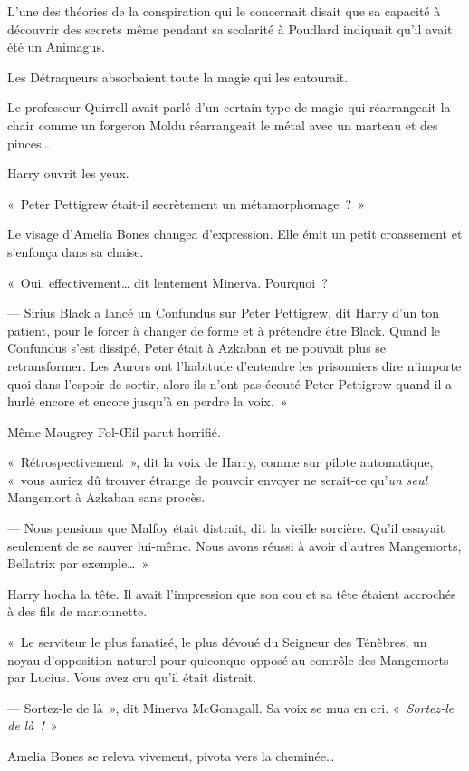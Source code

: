 L'une des théories de la conspiration qui le concernait disait que sa capacité à découvrir des secrets même pendant sa scolarité à Poudlard indiquait qu'il avait été un Animagus.

Les Détraqueurs absorbaient toute la magie qui les entourait.

Le professeur Quirrell avait parlé d'un certain type de magie qui réarrangeait la chair comme un forgeron Moldu réarrangeait le métal avec un marteau et des pinces…

Harry ouvrit les yeux.

«~Peter Pettigrew était-il secrètement un métamorphomage~?~»

Le visage d'Amelia Bones changea d'expression. Elle émit un petit croassement et s'enfonça dans sa chaise.

«~Oui, effectivement… dit lentement Minerva. Pourquoi~?

--- Sirius Black a lancé un Confundus sur Peter Pettigrew, dit Harry d'un ton patient, pour le forcer à changer de forme et à prétendre être Black. Quand le Confundus s'est dissipé, Peter était à Azkaban et ne pouvait plus se retransformer. Les Aurors ont l'habitude d'entendre les prisonniers dire n'importe quoi dans l'espoir de sortir, alors ils n'ont pas écouté Peter Pettigrew quand il a hurlé encore et encore jusqu'à en perdre la voix.~»

Même Maugrey Fol-Œil parut horrifié.

«~Rétrospectivement~», dit la voix de Harry, comme sur pilote automatique, «~vous auriez dû trouver étrange de pouvoir envoyer ne serait-ce qu'\emph{un seul} Mangemort à Azkaban sans procès.

--- Nous pensions que Malfoy était distrait, dit la vieille sorcière. Qu'il essayait seulement de se sauver lui-même. Nous avons réussi à avoir d'autres Mangemorts, Bellatrix par exemple…~»

Harry hocha la tête. Il avait l'impression que son cou et sa tête étaient accrochés à des fils de marionnette.

«~Le serviteur le plus fanatisé, le plus dévoué du Seigneur des Ténèbres, un noyau d'opposition naturel pour quiconque opposé au contrôle des Mangemorts par Lucius. Vous avez cru qu'il était distrait.

--- Sortez-le de là~», dit Minerva McGonagall. Sa voix se mua en cri. «~\emph{Sortez-le de là~!}~»

Amelia Bones se releva vivement, pivota vers la cheminée…


